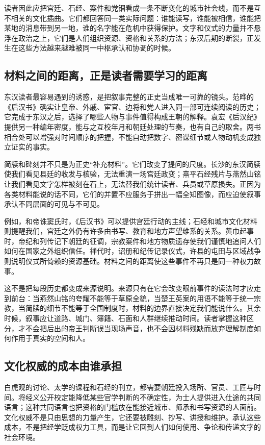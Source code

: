 读者因此应把宫廷、石经、案件和党锢看成一条不断变化的城市社会线，而不是互不相关的文化插曲。它们都回答同一类实际问题：谁能读写，谁能被相信，谁能把某地的消息带到另一地，谁的名字能在危机中获得保护。文字和仪式的力量并不悬浮在政治之上，它们是人们组织资源、资格和关系的方法；东汉后期的断裂，正发生在这些方法越来越难被同一中枢承认和协调的时候。

\subsection{材料之间的距离，正是读者需要学习的距离}

东汉读者最容易遇到的诱惑，是把叙事完整的正史当成唯一可靠的镜头。范晔的《后汉书》确实让皇帝、外戚、宦官、边将和党人进入同一部可连续阅读的历史；它完成于东汉之后，选择了哪些人物与事件值得构成王朝的解释。袁宏《后汉纪》提供另一种编年密度，能与之互校年月和朝廷处理的节奏，也有自己的取舍。两书相合处可以增强对时间顺序的把握，不能自动把数字、密谋细节或人物动机变成独立证实的事实。

简牍和碑刻并不只是为正史“补充材料”。它们改变了提问的尺度。长沙的东汉简牍使我们看见县廷的收发与核验，无法重演一场宫廷政变；熹平石经残片与燕然山铭让我们看见文字怎样被刻在石上，无法替我们统计读者、兵员或草原损失。正因为各类材料能说的话不同，它们的并置不应服务于拼出一幅全知图像，而应迫使叙事承认不同层面的可见与不可见。

例如，和帝诛窦氏时，《后汉书》可以提供宫廷行动的主线；石经和城市文化材料则提醒我们，宫廷之外仍有许多由书写、教育和地方声望维系的关系。黄巾起事时，帝纪和列传记下朝廷的征调，宗教案件和地方物质遗存使我们谨慎地追问人们如何在国家之外组织信任。禅代时，诏册和纪传记录仪式，许县的屯田与区域战争则说明仪式所倚赖的资源基础。材料之间的距离使这些事件不再只是同一种权力故事。

这不是把每段历史都变成来源说明。来源只有在它会改变眼前事件的读法时才应走到前台：当燕然山铭的夸耀不能等于草原全貌，当楚王英案的用语不能等于统一宗教，当简牍的细节不能等于全国制度时，材料的边界直接决定我们能说什么。其余时候，叙事应让道路、城门、簿籍、石面和人群继续推动时间。读者掌握这种区分，才不会把后出的帝王判断误当现场声音，也不会因材料残缺而放弃理解制度如何作用于真实的空间和人。

\subsection{文化权威的成本由谁承担}

白虎观的讨论、太学的课程和石经的刊立，都需要朝廷投入场所、官员、工匠与时间。将经义公开校定能降低某些官学判断的不确定性，为士人提供进入仕途的共同语言；这种共同语言也把资格的门槛放在能接近城市、师承和书写资源的人面前。文化权威不是只由思想的力量产生，它还要被雕刻、抄写、讲授和维护。承认这些成本，不是把经学贬成权力工具，而是让它回到人们如何使用、争论和传递文字的社会环境。

